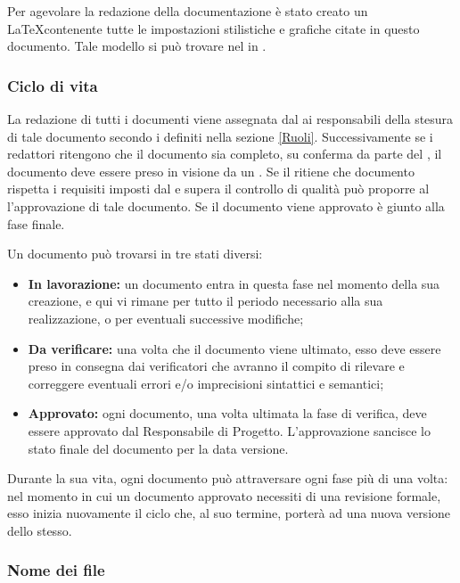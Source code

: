 \documentclass[12pt,a4paper]{article}
\begin{document}
Per agevolare la redazione della documentazione è stato creato un  \LaTeX contenente tutte le impostazioni stilistiche e grafiche citate in questo documento. Tale modello si può trovare nel  in .

\subsubsection{Ciclo di vita}

La redazione di tutti i documenti viene assegnata dal \PM{} ai responsabili della stesura di tale documento secondo i  definiti nella sezione \ref{Ruoli}. Successivamente se i redattori ritengono che il documento sia completo, su conferma da parte del \PM, il documento deve essere preso in visione da un \VR. Se il \VR{} ritiene che documento rispetta i requisiti imposti dal \PR{} e supera il controllo di qualità può proporre al \PM{} l'approvazione di tale documento. Se il documento viene approvato è giunto alla fase finale.

Un documento può trovarsi in tre stati diversi:
\begin{itemize}
	\item \textbf{In lavorazione:} un documento entra in questa fase nel momento della sua creazione, e qui vi rimane per tutto il periodo necessario alla sua realizzazione, o per eventuali successive modifiche;
	\item \textbf{Da verificare:} una volta che il documento viene ultimato, esso deve essere preso in consegna dai verificatori che avranno il compito di rilevare e correggere eventuali errori e/o imprecisioni sintattici e semantici;
	\item \textbf{Approvato:} ogni documento, una volta ultimata la fase di verifica, deve essere approvato dal Responsabile di Progetto. L’approvazione sancisce lo stato finale del documento per la data versione.
\end{itemize}

Durante la sua vita, ogni documento può attraversare ogni fase più di una volta: nel momento in cui un documento approvato necessiti di una revisione formale, esso inizia nuovamente il ciclo che, al suo termine, porterà ad una nuova versione dello stesso.

\subsubsection{Nome dei file}
\end{document}
